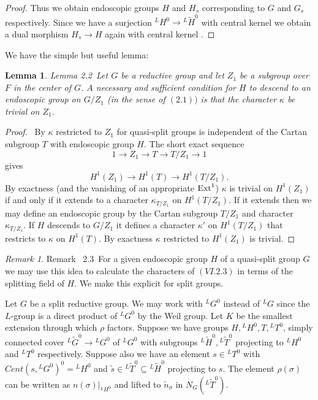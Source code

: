 \documentclass{memo-l}
\newtheorem{lemma}[theorem]{Lemma}
\theoremstyle{definition}
\theoremstyle{remark}
\newtheorem{remark}[theorem]{Remark}
\numberwithin{section}{chapter}
\numberwithin{equation}{chapter}
\begin{document}
\begin{proof}
Thus we obtain
endoscopic groups $H$ and $H_{s}$ corresponding to $G$ and $G_{s}$
respectively.  Since we have a surjection
${}^{L}H^{0} {\to} {}^{L}\tilde H^{0}$ with central kernel we
obtain a dual morphism $H_{s} {\to} H$ again
with central kernel \cite{MR546608}.
\end{proof}

{\medskip}


We have the simple but useful lemma:

\begin{lemma}{Lemma 2.2}\ Let $G$ be a reductive group and let $Z_{1}$ be a
subgroup over $F$ in the center of $G$.  $A$ necessary and sufficient
condition for $H$ to descend to an endoscopic group on $G/Z_{1}$ (in the
sense of $(2.1))$ is that the character ${\kappa}$ be trivial on $Z_{1}$.
\end{lemma}


\begin{proof} \ By \cite{MR909227} ${\kappa}$ restricted to $Z_{1}$ for
quasi-split groups is independent of the Cartan subgroup $T$ with
endoscopic group $H$.  The short exact sequence
$$
1 \to Z_{1} {\to} T {\to} T/Z_{1} \to 1
$$
gives
$$
H^{1}(Z_{1}) {\to} H^{1}(T) {\to} H^{1}(T/Z_{1}).
$$
By exactness (and the vanishing of an appropriate $\hbox{Ext}^1$)
${\kappa}$ is trivial on $H^{1}(Z_{1})$ if and only if it
extends to a character ${\kappa}_{T/Z_{1}}$ on $H^{1}(T/Z_{1})$.
%
%
%
If
it extends then we may define an endoscopic group by the Cartan subgroup
$T/Z_{1}$ and character ${\kappa}_{T/Z_{1}}.$ If $H$ descends to
$G/Z_{1}$ it defines a character ${\kappa}'$ on $H^{1}(T/Z_{1})$ that
restricts to ${\kappa}$ on $H^{1}(T)$.  By exactness ${\kappa}$ restricted
to $H^{1}(Z_{1})$ is trivial.
\end{proof}

\begin{remark}{Remark \ 2.3}\ For a given endoscopic group $H$ of a
quasi-split group $G$ we may use this idea to calculate the characters of
$(VI.2.3)$ in terms of the splitting field of $H$.  We make this explicit
for split groups.
\end{remark}

   Let $G$ be a split reductive group.  We may work with ${}^{L}G^{0}$
instead of ${}^{L}G$ since the $L$-group is a direct product of ${}^{L}G^{0}$
by the Weil group.  Let $K$ be the smallest extension through which ${\rho}$
factors.  Suppose we have groups $H, {}^{L}H^{0}, T, {}^{L}T^{0}$, simply
connected cover ${}^{L}\tilde G^{0} {\to} {}^{L}G^{0}$ of ${}^{L}G^{0}$ with
subgroups ${}^{L}\tilde H^{0}, {}^{L}\tilde T^{0}$ projecting to ${}^{L}H^{0}$
and ${}^{L}T^{0}$ respectively.  Suppose also we have an element $s  \in
{}^{L}T^{0}$ with $Cent(s,{}^{L}G^{0})^{0} = {}^{L}H^{0}$ and $\tilde s  \in
{}^{L}\tilde T^{0} {\subseteq} {}^{L}\tilde H^{0}$ projecting to $s$.  The
element ${\rho }({\sigma})$ can be written as $n({\sigma})\vert_{{}^{L}H^{0}}$
and lifted to $\tilde n _{{\sigma}}$ in $N_{G}({}^{L}\tilde T^{0})$.
\end{document}
